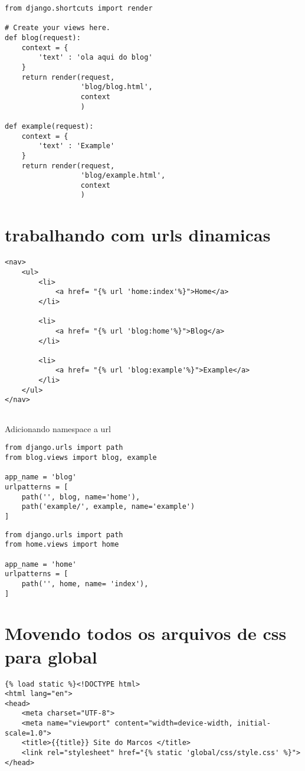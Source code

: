 \documentclass{article}
\begin{document}
\begin{lstlisting}[style=pythonStyle, caption={blog/views.py}]
    from django.shortcuts import render

# Create your views here.
def blog(request):
    context = {
        'text' : 'ola aqui do blog'
    }
    return render(request,
                  'blog/blog.html', 
                  context
                  )

def example(request):
    context = {
        'text' : 'Example'
    }
    return render(request, 
                  'blog/example.html', 
                  context
                  )

\end{lstlisting}
\section{trabalhando com urls dinamicas}
\begin{lstlisting}[style=djangohtml, caption={base/global/partials/menu.html}]
    <nav> 
    <ul>
        <li>
            <a href= "{% url 'home:index'%}">Home</a>
        </li>   
        
        <li>
            <a href= "{% url 'blog:home'%}">Blog</a>
        </li>   

        <li>
            <a href= "{% url 'blog:example'%}">Example</a>
        </li>   
    </ul>    
</nav>
   
\end{lstlisting}



Adicionando namespace a url
\begin{lstlisting}[style=pythonStyle, caption={blog/urls.py}]
from django.urls import path
from blog.views import blog, example

app_name = 'blog'
urlpatterns = [
    path('', blog, name='home'),
    path('example/', example, name='example')
]
\end{lstlisting}

\begin{lstlisting}[style=pythonStyle, caption={home/urls.py}]
from django.urls import path
from home.views import home

app_name = 'home'
urlpatterns = [
    path('', home, name= 'index'),
]
\end{lstlisting}

\section{Movendo todos os arquivos de css para global}
\begin{lstlisting}[style=djangohtml, caption={base/global/partials/head.html}]
    {% load static %}<!DOCTYPE html>
<html lang="en">
<head>
    <meta charset="UTF-8">
    <meta name="viewport" content="width=device-width, initial-scale=1.0">
    <title>{{title}} Site do Marcos </title>
    <link rel="stylesheet" href="{% static 'global/css/style.css' %}">
</head>
\end{lstlisting}   
\end{document}
